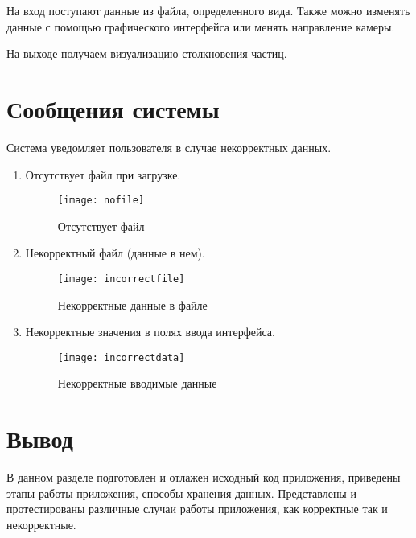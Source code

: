 На вход поступают данные из файла, определенного вида. Также можно изменять данные с помощью графического интерфейса или менять направление камеры. 

На выходе получаем визуализацию столкновения частиц. 


\section{\textbf{Сообщения  системы }}

Система уведомляет пользователя в случае некорректных данных. 

\begin{enumerate}
	\item Отсутствует файл при загрузке. 
	\begin{figure}[H]
		\centering
		\texttt{[image: nofile]}
		\caption{Отсутствует файл}
		\label{img:nofile}
	\end{figure}
	\item Некорректный файл (данные в нем). 
	\begin{figure}[H]
		\centering
		\texttt{[image: incorrectfile]}
		\caption{Некорректные данные в файле}
		\label{img:incorrectfile}
	\end{figure}
	\item Некорректные значения в полях ввода интерфейса. 
	\begin{figure}[H]
		\centering
		\texttt{[image: incorrectdata]}
		\caption{Некорректные вводимые данные}
		\label{img:incorrectdata}
	\end{figure}
\end{enumerate}

\section{\textbf{Вывод}}

В данном разделе подготовлен и отлажен исходный код приложения, приведены этапы работы приложения, способы хранения данных. Представлены и протестированы различные случаи работы приложения, как корректные так и некорректные. 
